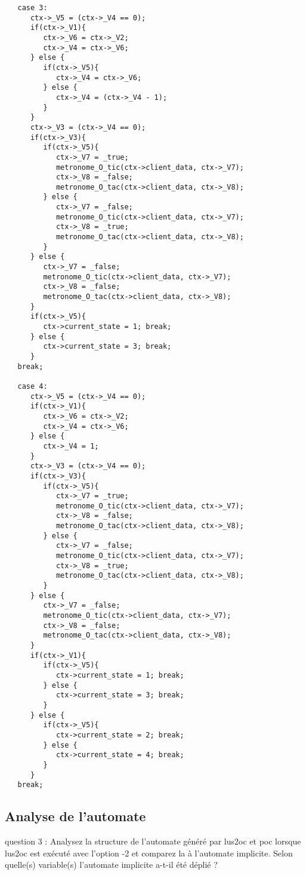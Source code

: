 \documentclass[a4paper]{article}
\begin{document}
\begin{verbatim}
   case 3:
      ctx->_V5 = (ctx->_V4 == 0);
      if(ctx->_V1){
         ctx->_V6 = ctx->_V2;
         ctx->_V4 = ctx->_V6;
      } else {
         if(ctx->_V5){
            ctx->_V4 = ctx->_V6;
         } else {
            ctx->_V4 = (ctx->_V4 - 1);
         }
      }
      ctx->_V3 = (ctx->_V4 == 0);
      if(ctx->_V3){
         if(ctx->_V5){
            ctx->_V7 = _true;
            metronome_O_tic(ctx->client_data, ctx->_V7);
            ctx->_V8 = _false;
            metronome_O_tac(ctx->client_data, ctx->_V8);
         } else {
            ctx->_V7 = _false;
            metronome_O_tic(ctx->client_data, ctx->_V7);
            ctx->_V8 = _true;
            metronome_O_tac(ctx->client_data, ctx->_V8);
         }
      } else {
         ctx->_V7 = _false;
         metronome_O_tic(ctx->client_data, ctx->_V7);
         ctx->_V8 = _false;
         metronome_O_tac(ctx->client_data, ctx->_V8);
      }
      if(ctx->_V5){
         ctx->current_state = 1; break;
      } else {
         ctx->current_state = 3; break;
      }
   break;
   
   case 4:
      ctx->_V5 = (ctx->_V4 == 0);
      if(ctx->_V1){
         ctx->_V6 = ctx->_V2;
         ctx->_V4 = ctx->_V6;
      } else {
         ctx->_V4 = 1;
      }
      ctx->_V3 = (ctx->_V4 == 0);
      if(ctx->_V3){
         if(ctx->_V5){
            ctx->_V7 = _true;
            metronome_O_tic(ctx->client_data, ctx->_V7);
            ctx->_V8 = _false;
            metronome_O_tac(ctx->client_data, ctx->_V8);
         } else {
            ctx->_V7 = _false;
            metronome_O_tic(ctx->client_data, ctx->_V7);
            ctx->_V8 = _true;
            metronome_O_tac(ctx->client_data, ctx->_V8);
         }
      } else {
         ctx->_V7 = _false;
         metronome_O_tic(ctx->client_data, ctx->_V7);
         ctx->_V8 = _false;
         metronome_O_tac(ctx->client_data, ctx->_V8);
      }
      if(ctx->_V1){
         if(ctx->_V5){
            ctx->current_state = 1; break;
         } else {
            ctx->current_state = 3; break;
         }
      } else {
         if(ctx->_V5){
            ctx->current_state = 2; break;
         } else {
            ctx->current_state = 4; break;
         }
      }
   break;
\end{verbatim}

\subsection{Analyse de l'automate}

question 3 : Analysez la structure de l'automate généré par lus2oc et
poc lorsque lus2oc est exécuté avec l'option -2 et comparez la à
l'automate implicite. Selon quelle(s) variable(s) l'automate implicite
a-t-il été déplié ?
\end{document}
